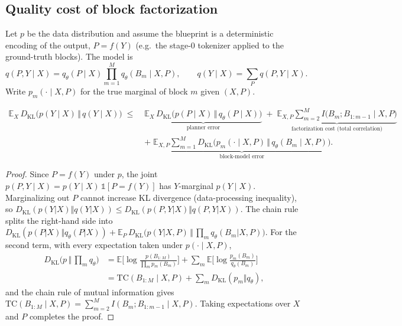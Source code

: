 \subsection{Quality cost of block factorization}
\label{sec:kl}

Let $p$ be the data distribution and assume the blueprint is a deterministic
encoding of the output, $P=f(Y)$ (e.g.\ the stage-0 tokenizer applied to the
ground-truth blocks). The model is
\begin{equation}
  q(P,Y\mid X)=q_\theta(P\mid X)\prod_{m=1}^{M}q_\theta(B_m\mid X,P),
  \qquad q(Y\mid X)=\sum_{P}q(P,Y\mid X).
\end{equation}
Write $p_m(\cdot\mid X,P)$ for the true marginal of block $m$ given $(X,P)$.

\begin{theorem}
\label{thm:kl}
\begin{align}
  \mathbb{E}_X\,D_{\mathrm{KL}}\big(p(Y\!\mid\!X)\,\Vert\,q(Y\!\mid\!X)\big)
  \;\le\;&
  \underbrace{\mathbb{E}_X\,D_{\mathrm{KL}}\big(p(P\!\mid\!X)\,\Vert\,q_\theta(P\!\mid\!X)\big)}_{\text{planner error}}
  \;+\;
  \underbrace{\mathbb{E}_{X,P}\sum_{m=2}^{M}I\big(B_m;B_{1:m-1}\mid X,P\big)}_{\text{factorization cost (total correlation)}}
  \nonumber\\
  &+\;
  \underbrace{\mathbb{E}_{X,P}\sum_{m=1}^{M}D_{\mathrm{KL}}\big(p_m(\cdot\!\mid\!X,P)\,\Vert\,q_\theta(B_m\!\mid\!X,P)\big)}_{\text{block-model error}}.
  \label{eq:kl}
\end{align}
\end{theorem}

\begin{proof}
Since $P=f(Y)$ under $p$, the joint $p(P,Y\mid X)=p(Y\mid X)\,\mathbb{1}[P=f(Y)]$
has $Y$-marginal $p(Y\mid X)$. Marginalizing out $P$ cannot increase KL
divergence (data-processing inequality), so
$D_{\mathrm{KL}}(p(Y|X)\Vert q(Y|X))\le D_{\mathrm{KL}}(p(P,Y|X)\Vert q(P,Y|X))$.
The chain rule splits the right-hand side into
$D_{\mathrm{KL}}(p(P|X)\Vert q_\theta(P|X))
 +\mathbb{E}_{P}\,D_{\mathrm{KL}}\big(p(Y|X,P)\,\Vert\,\textstyle\prod_m q_\theta(B_m|X,P)\big)$.
For the second term, with every expectation taken under $p(\cdot\mid X,P)$,
\begin{align*}
  D_{\mathrm{KL}}\Big(p\,\Big\Vert\,\prod_m q_\theta\Big)
  &=\mathbb{E}\Big[\log\frac{p(B_{1:M})}{\prod_m p_m(B_m)}\Big]
   +\sum_m\mathbb{E}\Big[\log\frac{p_m(B_m)}{q_\theta(B_m)}\Big]\\
  &=\mathrm{TC}(B_{1:M}\mid X,P)+\sum_m D_{\mathrm{KL}}(p_m\Vert q_\theta),
\end{align*}
and the chain rule of mutual information gives
$\mathrm{TC}(B_{1:M}\mid X,P)=\sum_{m=2}^{M}I(B_m;B_{1:m-1}\mid X,P)$.
Taking expectations over $X$ and $P$ completes the proof.
\end{proof}

